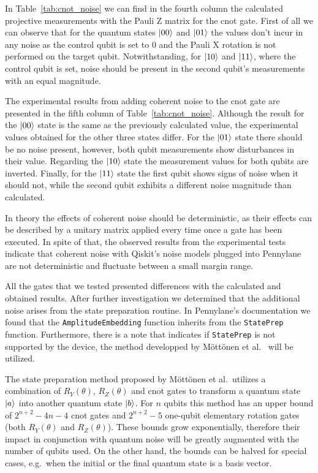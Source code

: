 In Table~\ref{tab:cnot_noise} we can find in the fourth column the calculated
projective measurements with the Pauli Z matrix for the \ac{cnot} gate.
First of all we can observe that for the quantum states \(\ket{00}\)
and \(\ket{01}\) the values don't incur in any noise as the control
qubit is set to 0 and the Pauli X rotation is not performed on the target
qubit. Notwithstanding, for \(\ket{10}\) and \(\ket{11}\), where the
control qubit is set, noise should be present in the second qubit's
measurements with an equal magnitude. \

The experimental results from adding coherent noise to the
\ac{cnot} gate are presented in the fifth column of Table~\ref{tab:cnot_noise}.
Although the result for the \(\ket{00}\) state is the same as the
previously calculated value, the experimental values obtained for
the other three states differ. For the \(\ket{01}\) state there
should be no noise present, however, both qubit measurements
show disturbances in their value. Regarding the \(\ket{10}\) state
the measurement values for both qubits are inverted. Finally,
for the \(\ket{11}\) state the first qubit shows signs of noise
when it should not, while the second qubit exhibits a different noise
magnitude than calculated. \

In theory the effects of coherent noise should be deterministic,
as their effects can be described by a unitary matrix applied
every time once a gate has been executed. In spite of that,
the observed results from the experimental tests indicate that
coherent noise with Qiskit's noise models plugged into Pennylane
are not deterministic and fluctuate between a small margin range. \

All the gates that we tested presented differences with the
calculated and obtained results. After further investigation
we determined that the additional noise arises from the state
preparation routine. In Pennylane's documentation we found that
the \colorbox{inline_gray}{\lstinline|AmplitudeEmbedding|} function
inherits from the \colorbox{inline_gray}{\lstinline|StatePrep|}
function. Furthermore, there is a note that indicates
if \colorbox{inline_gray}{\lstinline|StatePrep|} is not supported
by the device, the method developped by Möttönen et al.~\cite{mottonen_transformation_2004}
will be utilized. \

The state preparation method proposed by Möttönen et al.\ utilizes a
combination of \(R_{Y}(\theta)\), \(R_{Z}(\theta)\) and \ac{cnot}
gates to transform a quantum state \(\ket{a}\) into another quantum state
\(\ket{b}\). For \(n\) qubits this method has an upper bound of
\(2^{n+2}-4n-4\) \ac{cnot} gates and \(2^{n+2}-5\) one-qubit elementary
rotation gates (both \(R_{Y}(\theta)\) and \(R_{Z}(\theta)\)). These
bounds grow exponentially, therefore their impact in conjunction with
quantum noise will be greatly augmented with the number of qubits used.
On the other hand, the bounds can be halved for special cases, e.g.\ when
the initial or the final quantum state is a basis vector. \

